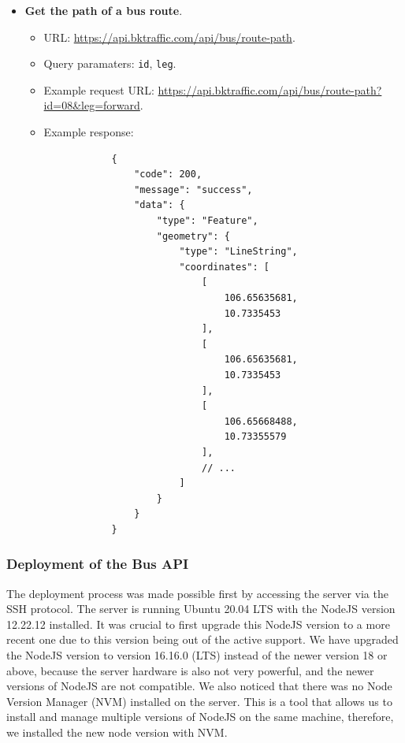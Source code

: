 \begin{itemize}
    \item \textbf{Get the path of a bus route}.
    \begin{itemize}
        \item URL: \url{https://api.bktraffic.com/api/bus/route-path}.
        \item Query paramaters: \lstinline{id}, \lstinline{leg}.
        \item Example request URL: \url{https://api.bktraffic.com/api/bus/route-path?id=08&leg=forward}.
        \item Example response:
        \begin{lstlisting}
            {
                "code": 200,
                "message": "success",
                "data": {
                    "type": "Feature",
                    "geometry": {
                        "type": "LineString",
                        "coordinates": [
                            [
                                106.65635681,
                                10.7335453
                            ],
                            [
                                106.65635681,
                                10.7335453
                            ],
                            [
                                106.65668488,
                                10.73355579
                            ],
                            // ...  
                        ]
                    }
                }
            }
        \end{lstlisting}
    \end{itemize} 
\end{itemize}

\subsubsection{Deployment of the Bus API}
The deployment process was made possible first by accessing the server via the SSH protocol. The server is running Ubuntu 20.04 LTS with the NodeJS version 12.22.12 installed. It was crucial to first upgrade this NodeJS version to a more recent one due to this version being out of the active support. We have upgraded the NodeJS version to version 16.16.0 (LTS) instead of the newer version 18 or above, because the server hardware is also not very powerful, and the newer versions of NodeJS are not compatible. We also noticed that there was no Node Version Manager (NVM) installed on the server. This is a tool that allows us to install and manage multiple versions of NodeJS on the same machine, therefore, we installed the new node version with NVM.

